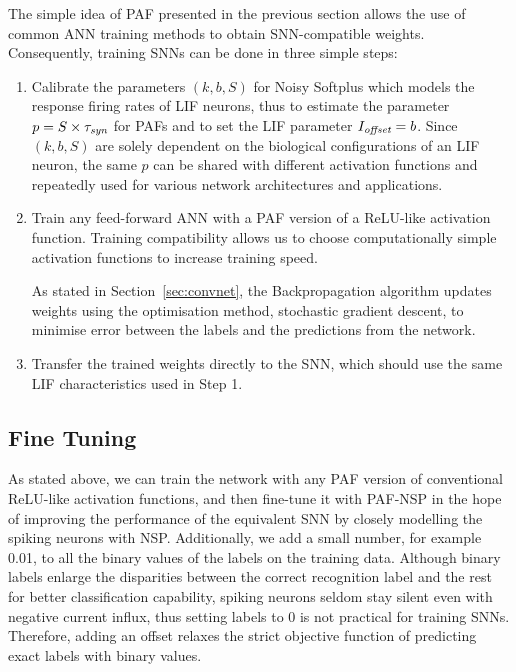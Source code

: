 	The simple idea of PAF presented in the previous section allows the use of common ANN training methods to obtain SNN-compatible weights.
	Consequently, training SNNs can be done in three simple steps: 
	\begin{enumerate}
		\item Calibrate the parameters $(k,b, S)$ for Noisy Softplus which models the response firing rates of LIF neurons, thus to estimate the parameter $p=S \times \tau_{\textit{\textrm{syn}}}$ for PAFs and to set the LIF parameter $I_{\textit{\textrm{offset}}}=b$. Since $(k,b, S)$ are solely dependent on the biological configurations of an LIF neuron, the same $p$ can be shared with different activation functions and repeatedly used for various network architectures and applications.
		\item Train any feed-forward ANN with a PAF version of a ReLU-like activation function.
		Training compatibility allows us to choose computationally simple activation functions to increase training speed.
		
		As stated in Section~\ref{sec:convnet}, the Backpropagation algorithm updates weights using the optimisation method, stochastic gradient descent, to minimise error between the labels and the predictions from the network.
		\item Transfer the trained weights directly to the SNN, which should use the same LIF characteristics used in Step 1.
	\end{enumerate}
	
	\subsection{Fine Tuning}
	\label{subsec:finetune}
	As stated above, we can train the network with any PAF version of conventional ReLU-like activation functions, and then fine-tune it with PAF-NSP in the hope of improving the performance of the equivalent SNN by closely modelling the spiking neurons with NSP.
	Additionally, we add a small number, for example 0.01, to all the binary values of the labels on the training data.
	Although binary labels enlarge the disparities between the correct recognition label and the rest for better classification capability, 
	spiking neurons seldom stay silent even with negative current influx, thus setting labels to 0 is not practical for training SNNs.
	Therefore, adding an offset relaxes the strict objective function of predicting exact labels with binary values.
	
